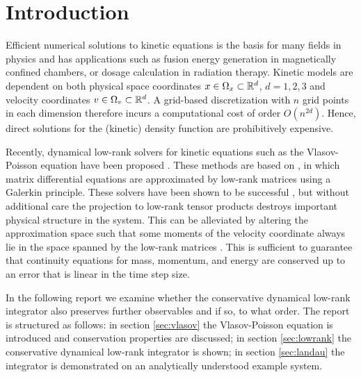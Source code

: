 
\section{Introduction}\label{sec:intro}

Efficient numerical solutions to kinetic equations is the basis for many fields in 
physics and has applications such as fusion energy generation in magnetically confined 
chambers, or dosage calculation in radiation therapy. Kinetic models are dependent on 
both physical space coordinates $x \in \Omega_x \subset \mathbb{R}^d$, $d = 1, 2, 3$ and 
velocity coordinates 
$v \in \Omega_v \subset \mathbb{R}^d$. A grid-based discretization with $n$ grid points in each 
dimension therefore incurs a computational cost of order $O(n^{2 d})$. Hence, direct 
solutions for the (kinetic) density function are prohibitively expensive. 

Recently, dynamical low-rank solvers for kinetic equations such as the Vlasov-Poisson 
equation have been proposed \cite{einkemmer2018}. These methods are based on 
\cite{lowrank}, in which matrix differential equations are approximated by low-rank 
matrices using a Galerkin principle. These solvers have been shown to be successful 
\cite{Cassini_2022}, but without additional care the projection to low-rank tensor 
products destroys important physical structure in the system. This can be alleviated by 
altering the approximation space such that some moments of the velocity coordinate always 
lie in the space spanned by the low-rank matrices \cite{robustlowrank}. This is sufficient 
to guarantee that continuity equations for mass, momentum, and energy are conserved up to 
an error that is linear in the time step size. 

In the following report we examine whether the conservative dynamical low-rank integrator 
also preserves further observables and if so, to what order. The report is structured as 
follows: in section \ref{sec:vlasov} the Vlasov-Poisson equation is introduced and 
conservation properties are discussed; in section \ref{sec:lowrank} the conservative 
dynamical low-rank integrator is shown; in section \ref{sec:landau} the integrator is 
demonstrated on an analytically understood example system. 


